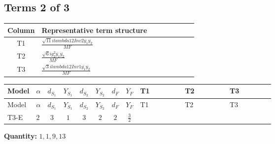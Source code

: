 \documentclass[8pt]{article}
\begin{document}
\begin{landscape}
\subsection*{Terms 2 of 3}
\begin{center}
\begin{tabular}{@{}c >{\raggedright\arraybackslash}p{0.82\linewidth}@{}}
\toprule
Column & Representative term structure \\
\midrule
T1 & \(\displaystyle \frac{\sqrt{11} i lambda12Inv2 \overline{y_{1}} \overline{y_{2}}}{MF}\) \\
\midrule
T2 & \(\displaystyle \frac{\sqrt{6} i g_{2}^{2} \overline{y_{1}} \overline{y_{2}}}{MF}\) \\
\midrule
T3 & \(\displaystyle \frac{\sqrt{3} i lambda12Inv1 \overline{y_{1}} \overline{y_{2}}}{MF}\) \\
\midrule
\bottomrule
\end{tabular}
\end{center}
\smallskip
\tiny
\begin{longtable}{@{}llcccccc >{\raggedright\arraybackslash}p{0.21\linewidth} >{\raggedright\arraybackslash}p{0.21\linewidth} >{\raggedright\arraybackslash}p{0.21\linewidth}@{}}
\toprule
Model & $\alpha$ & $d_{S_1}$ & $Y_{S_1}$ & $d_{S_2}$ & $Y_{S_2}$ & $d_F$ & $Y_F$ & T1 & T2 & T3 \\
\midrule
\endfirsthead
\toprule
Model & $\alpha$ & $d_{S_1}$ & $Y_{S_1}$ & $d_{S_2}$ & $Y_{S_2}$ & $d_F$ & $Y_F$ & T1 & T2 & T3 \\
\midrule
\endhead
T3-E & $2$ & $3$ & $1$ & $3$ & $2$ & $2$ & $\frac{3}{2}$ & \scriptsize\adjustbox{max width=\linewidth}{$\begin{gathered} - \frac{3 \sqrt{11} i lambda12Inv2 \overline{y_{1}} \overline{y_{2}}}{22 MF}\end{gathered}$} & \scriptsize\adjustbox{max width=\linewidth}{$\begin{gathered} - \frac{\sqrt{6} i g_{2}^{2} \overline{y_{1}} \overline{y_{2}}}{3 MF}\end{gathered}$} & \scriptsize\adjustbox{max width=\linewidth}{$\begin{gathered} \frac{\sqrt{3} i lambda12Inv1 \overline{y_{1}} \overline{y_{2}}}{6 MF}\end{gathered}$} \\
\midrule
\bottomrule
\end{longtable}
\clearpage
\noindent\textbf{Quantity: }$\mathrm{1,1,9,13}$\par\smallskip

\end{landscape}
\end{document}
